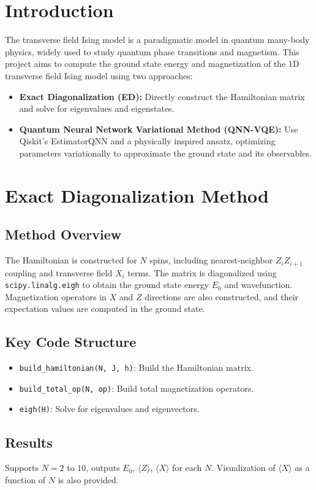 
\section{Introduction}
The transverse field Ising model is a paradigmatic model in quantum many-body physics, widely used to study quantum phase transitions and magnetism. This project aims to compute the ground state energy and magnetization of the 1D transverse field Ising model using two approaches:

\begin{itemize}
    \item \textbf{Exact Diagonalization (ED):} Directly construct the Hamiltonian matrix and solve for eigenvalues and eigenstates.
    \item \textbf{Quantum Neural Network Variational Method (QNN-VQE):} Use Qiskit's EstimatorQNN and a physically inspired ansatz, optimizing parameters variationally to approximate the ground state and its observables.
\end{itemize}

\section{Exact Diagonalization Method}
\subsection{Method Overview}
The Hamiltonian is constructed for $N$ spins, including nearest-neighbor $Z_iZ_{i+1}$ coupling and transverse field $X_i$ terms. The matrix is diagonalized using \texttt{scipy.linalg.eigh} to obtain the ground state energy $E_0$ and wavefunction. Magnetization operators in $X$ and $Z$ directions are also constructed, and their expectation values are computed in the ground state.

\subsection{Key Code Structure}
\begin{itemize}
    \item \texttt{build\_hamiltonian(N, J, h)}: Build the Hamiltonian matrix.
    \item \texttt{build\_total\_op(N, op)}: Build total magnetization operators.
    \item \texttt{eigh(H)}: Solve for eigenvalues and eigenvectors.
\end{itemize}

\subsection{Results}
Supports $N=2$ to $10$, outputs $E_0$, $\langle Z \rangle$, $\langle X \rangle$ for each $N$. Visualization of $\langle X \rangle$ as a function of $N$ is also provided.

